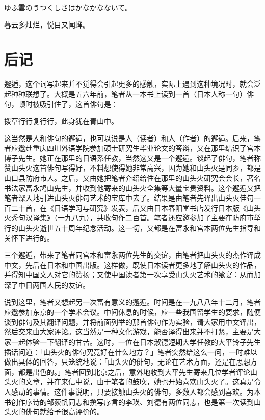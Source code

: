 \begin{haiku}
    {\FH ゆふ雲のうつくしさはかなかなないて。}

    {\FK 暮云多灿烂，悦目又闻蝉。}
\end{haiku}

\chapter{\FK 后记}

{\FS
邂逅，这个词写起来并不觉得会引起更多的感触，实际上遇到这种境况时，就会泛起种种联想了。大概是五六年前，笔者从一本书上读到一首（日本人称一句）俳句，顿时被吸引住了，这首俳句是：

拨草行行复行行，此身犹在青山中。

这当然是人和俳句的邂逅，也可以说是人（读者）和人（作者）的邂逅。后来，笔者应邀赴重庆四川外语学院参加硕士研究生毕业论文的答辩，又在那里结识了宫本博子先生。她正在那里的日语系任教，当然这又是一个邂逅。谈起了俳句，笔者称赞山头火这首俳句写得好，不料想使得她非常高兴，因为她和山头火是同乡，都是山口县防府市人。之后，又由她把笔者介绍给住在那里的山头火研究会会长，著名书法家富永鸠山先生，并收到他寄来的山头火全集等大量宝贵资料。这个邂逅又把笔者深入地引进山头火俳句艺术的宝库中去了。结果是由笔者先译出山头火佳句一百二十首，在《日语学习与研究》发表，后又由日本春阳堂书店发行日本版《山头火秀句汉译集》（一九八九），共收句作二百首。笔者还应邀参加了主要在防府市举行的山头火逝世五十周年纪念活动。这一切，又都是在富永和宫本两位先生指导和关怀下进行的。

三个邂逅，带来了笔者同宫本和富永两位先生的交谊，由笔者把山头火的杰作译成中文，先后在日本和中国出版。这样做，既使日本读者更多地了解山头火的作品，并得知中国文人对它的赞扬；又使中国读者第一次享受山头火艺术的飨宴：从而加深了中日两国人民的友谊。

说到这里，笔者又想起另一次富有意义的邂逅。时间是在一九八八年十二月，笔者应邀参加东京的一个学术会议。中间休息的时候，应一些我国留学生的要求，随便谈到俳句及其翻译问题，并将前面列举的那首俳句作为实验，请大家用中文译出，然后交来由大家评论。这当然是一种文化游戏，能否译得出来并不打紧，主要是大家一起体验一下翻译的甘苦。这时，一位在日本淑德短期大学任教的大平铃子先生插话问道：「山头火的俳句究竟好在什么地方？」笔者突然给这么一问，一时难以做出具体的回答，只笼统地说：「山头火的俳句，无论在艺术方面，还是在思想方面，都是出色的。」笔者回到北京之后，意外地收到大平先生寄来几位学者评论山头火的文章，并在来信中说，由于笔者的鼓吹，她也开始喜欢山头火了。这真是令人感动的事情。这件事说明，只要接触山头火的俳句，多数人都会感到喜欢。为本书创作序诗的邹荻帆同志和撰写序言的李瑛、刘德有两位同志，也是第一次读到山头火的俳句就给予很高评价的。

}
